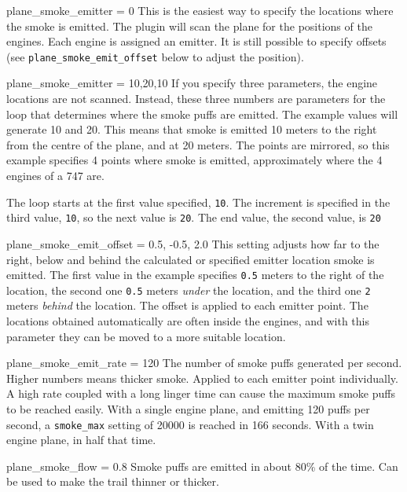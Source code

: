 \documentclass[a4paper,12pt]{article}
\newenvironment{vlist}[1]{%
\begin{list}{}{%
    \settowidth{\labelwidth}{\tt #1 }     %
    \setlength{\leftmargin}{\labelwidth}  %
    \addtolength{\leftmargin}{\labelsep}  %
    \setlength{\parsep}{0.5ex plus 0.2ex minus 0.2ex}
    \setlength{\itemsep}{0.3ex}
    \renewcommand{\makelabel}[1]{\color{headings}\tt ##1 \color{text1}\hfill}}}%
{\end{list}}
\begin{document}
\begin{vlist}{}

\item[plane\_smoke\_emitter = 0] This is the easiest way to specify
  the locations where the smoke is emitted. The plugin will scan the
  plane for the positions of the engines. Each engine is assigned an
  emitter. It is still possible to specify offsets (see
  \texttt{plane\_smoke\_emit\_offset} below to adjust the position).

\item[plane\_smoke\_emitter = 10,20,10] If you specify three
  parameters, the engine locations are not scanned. Instead, these three numbers are
  parameters for the loop that determines where the smoke puffs are emitted.
  The example values will generate 10 and 20. This means that
  smoke is emitted 10 meters to the right from the centre of the plane, and at 20
  meters. The points are mirrored, so this example specifies 4 points where
  smoke is emitted, approximately where the 4 engines of a 747 are.
  \par\indent The loop starts at the first value specified, \texttt{10}. The
  increment is specified in the third value, \texttt{10}, so the next
  value is \texttt{20}. The end value, the second value, is \texttt{20}

\item[plane\_smoke\_emit\_offset = 0.5, -0.5, 2.0] This setting
  adjusts how far to the right, below and behind the calculated or
  specified emitter location smoke is emitted. The first value in the
  example specifies \texttt{0.5} meters to the right of the location,
  the second one \texttt{0.5} meters \textsl{under} the location, and
  the third one \texttt{2} meters \textsl{behind} the location. The
  offset is applied to each emitter point. The locations obtained
  automatically are often inside the engines, and with this parameter
  they can be moved to a more suitable location.

\item[plane\_smoke\_emit\_rate = 120] The number of smoke puffs 
  generated per second. Higher numbers means thicker smoke. Applied to
  each emitter point individually. A high rate coupled with a long
  linger time can cause the maximum smoke puffs to be reached easily.
  With a single engine plane, and emitting 120 puffs per second,  
  a \texttt{smoke\_max} setting of 20000 is reached in 166 seconds.
  With a twin engine plane, in half that time.

\item[plane\_smoke\_flow = 0.8] Smoke puffs are emitted in about 80\%
  of the time. Can be used to make the trail thinner or thicker.


\end{vlist}
\end{document}
